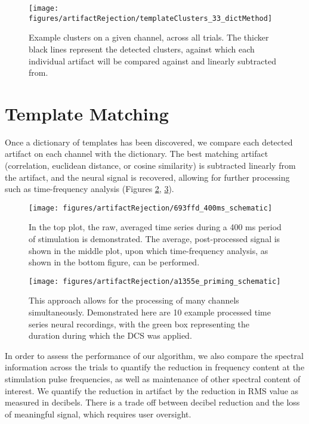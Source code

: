 \begin{figure}[ht]
	\centering
	\texttt{[image: figures/artifactRejection/templateClusters\_33\_dictMethod]}
	\caption[Detected clusters for an example channel]{Example clusters on a given channel, across all trials. The thicker black lines represent the detected clusters, against which each individual artifact will be compared against and linearly subtracted from. }
	\label{fig:templates}
\end{figure}

\section{Template Matching}

Once a dictionary of templates has been discovered, we compare each detected artifact on each channel with the dictionary. The best matching artifact (correlation, euclidean distance, or cosine similarity) is subtracted linearly from the artifact, and the neural signal is recovered, allowing for further processing such as time-frequency analysis (Figures \ref{fig:693ffd_400ms_schematic}, \ref{fig:a1355e_priming_schematic}).

\begin{figure}[ht]
	\centering
	\texttt{[image: figures/artifactRejection/693ffd\_400ms\_schematic]}
	\caption[Processing pipeline and subsequent time-frequency analysis for an example channel]{In the top plot, the raw, averaged time series during a 400 ms period of stimulation is demonstrated. The average, post-processed signal is shown in the middle plot, upon which time-frequency analysis, as shown in the bottom figure, can be performed. }
	\label{fig:693ffd_400ms_schematic}
\end{figure}


\begin{figure}[ht]
	\centering
	\texttt{[image: figures/artifactRejection/a1355e\_priming\_schematic]}
	\caption[Multiple electrode time series following stimulation extraction.]{This approach allows for the processing of many channels simultaneously. Demonstrated here are 10 example processed time series neural recordings, with the green box representing the duration during which the DCS was applied. 
	}
	\label{fig:a1355e_priming_schematic}
\end{figure}

In order to assess the performance of our algorithm, we also compare the spectral information across the trials to quantify the reduction in frequency content at the stimulation pulse frequencies, as well as maintenance of other spectral content of interest. We quantify the reduction in artifact by the reduction in RMS value as measured in decibels. There is a trade off between decibel reduction and the loss of meaningful signal, which requires user oversight. 

